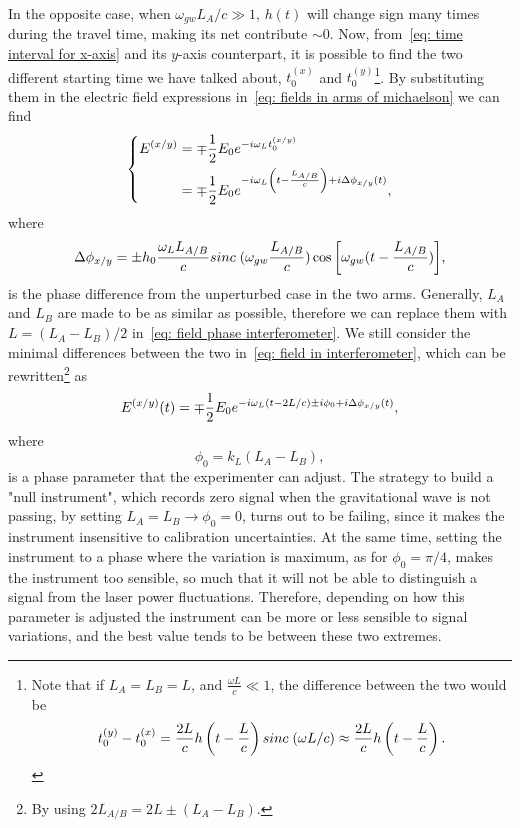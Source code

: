 In the opposite case, when $\omega_{gw}L_A/c \gg 1$, $h(t)$ will change sign many times during the travel time, making its net contribute $\sim0$.
Now, from~\eqref{eq: time interval for x-axis} and its $y$-axis counterpart, it is possible to find the two different starting time we have talked about, $t_0^{(x)}$ and $t_0^{(y)}$\footnote{Note that if $L_A=L_B=L$, and $\frac{\omega L}{c}\ll 1$, the difference between the two would be
\[
    t_0^{(y)} - t_0^{(x)} = \frac{2L}{c} h\left(t-\frac{L}{c}\right)sinc\hspace{1mm}(\omega L/c)\approx \frac{2L}{c}h\left(t-\frac{L}{c}\right).
\]
}. 
By substituting them in the electric field expressions in~\eqref{eq: fields in arms of michaelson} we can find
\begin{equation}
    \left\{
        \begin{aligned}
            E^{(x/y)} &= \mp\frac{1}{2}E_0e^{-i\omega_L t_0^{(x/y)}} \\
            \vspace{1mm}
                      &= \mp\frac{1}{2}E_0e^{-i\omega_L \left(t-\frac{L_{A/B}}{c}\right)+i\Delta\phi_{x/y}(t)},
        \end{aligned}
    \right.
    \label{eq: field in interferometer}
\end{equation}
where
\begin{equation}
    \Delta\phi_{x/y}= \pm h_0 \frac{\omega_L L_{A/B}}{c} sinc\hspace{1mm}(\omega_{gw}\frac{L_{A/B}}{c})\cos{\left[ \omega_{gw}(t - \frac{L_{A/B}}{c}) \right]},
    \label{eq: field phase interferometer}
\end{equation}
is the phase difference from the unperturbed case in the two arms.
Generally, $L_A$ and $L_B$ are made to be as similar as possible, therefore we can replace them with $L=(L_A - L_B)/2$ in~\eqref{eq: field phase interferometer}. 
We still consider the minimal differences between the two in~\eqref{eq: field in interferometer}, which can be rewritten\footnote{By using $2L_{A/B} = 2L \pm (L_A - L_B)$.} as 
\begin{equation*}
    E^{(x/y)}(t) = \mp \frac{1}{2}E_0 e^{-i\omega_L(t-2L/c) \pm i\phi_0 + i\Delta\phi_{x/y}(t)},
    \notag
\end{equation*}
where
\begin{equation}
    \phi_0 = k_L(L_A - L_B),
    \label{eq: programmable phase difference}
\end{equation}
is a phase parameter that the experimenter can adjust.
The strategy to build a "null instrument", which records zero signal when the gravitational wave is not passing, by setting $L_A = L_B \to \phi_0=0$, turns out to be failing, since it makes the instrument insensitive to calibration uncertainties.
At the same time, setting the instrument to a phase where the variation is maximum, as for $\phi_0=\pi/4$, makes the instrument too sensible, so much that it will not be able to distinguish a signal from the laser power fluctuations.
Therefore, depending on how this parameter is adjusted the instrument can be more or less sensible to signal variations, and the best value tends to be between these two extremes.

